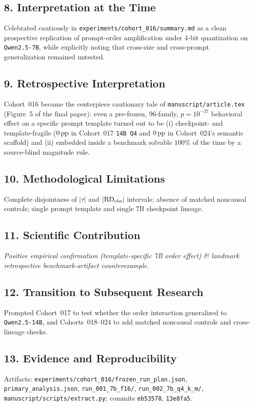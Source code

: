 \subsection*{8. Interpretation at the Time}
Celebrated cautiously in \texttt{experiments/cohort\_016/summary.md} as a clean prospective replication of prompt-order amplification under 4-bit quantization on \texttt{Qwen2.5-7B}, while explicitly noting that cross-size and cross-prompt generalization remained untested.

\subsection*{9. Retrospective Interpretation}
Cohort~016 became the centerpiece cautionary tale of \texttt{manuscript/article.tex} (Figure~5 of the final paper): even a pre-frozen, 96-family, $p = 10^{-37}$ behavioral effect on a specific prompt template turned out to be (i) checkpoint- and template-fragile ($0\,\mathrm{pp}$ in Cohort~017 \texttt{14B Q4} and $0\,\mathrm{pp}$ in Cohort~024's semantic scaffold) and (ii) embedded inside a benchmark solvable $100\%$ of the time by a source-blind magnitude rule.

\subsection*{10. Methodological Limitations}
Complete disjointness of $|\tau|$ and $|\mathrm{RD}_{\mathrm{obs}}|$ intervals; absence of matched noncausal controls; single prompt template and single 7B checkpoint lineage.

\subsection*{11. Scientific Contribution}
\emph{Positive empirical confirmation (template-specific 7B order effect) \& landmark retrospective benchmark-artifact counterexample.}

\subsection*{12. Transition to Subsequent Research}
Prompted Cohort~017 to test whether the order interaction generalized to \texttt{Qwen2.5-14B}, and Cohorts~018--024 to add matched noncausal controls and cross-lineage checks.

\subsection*{13. Evidence and Reproducibility}
Artifacts: \texttt{experiments/cohort\_016/frozen\_run\_plan.json}, \texttt{primary\_analysis.json}, \texttt{run\_001\_7b\_f16/}, \texttt{run\_002\_7b\_q4\_k\_m/}, \texttt{manuscript/scripts/extract.py}; commits \texttt{eb53578}, \texttt{13e8fa5}.

